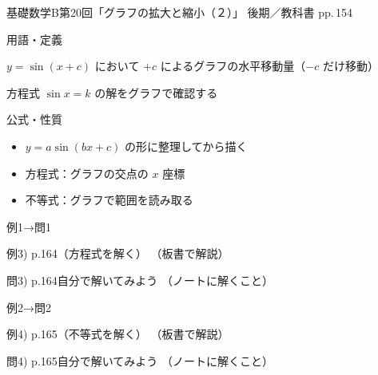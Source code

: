 \documentclass[aspectratio=43,professionalfonts,handout]{beamer}
\newcommand{\LectureNum}{20}
\newcommand{\LectureTitle}{グラフの拡大と縮小（２）}
\newcommand{\TextPages}{pp.\,154}
\newcommand{\CourseName}{基礎数学B}
\renewcommand{\TermName}{後期}
\begin{document}
\begin{frame}{\CourseName\quad 第\LectureNum 回「\LectureTitle 」}
  {\small \TermName\quad \TeacherName\quad ／\quad 教科書 \TextPages}

  \begin{block}{用語・定義}
  \begin{description}[labelwidth=5.5em]
    \item[\kw{位相：$+c$ によるグラフの水平移動}] $y = \sin(x + c)$ において $+c$ によるグラフの水平移動量（$-c$ だけ移動）
    \item[\kw{グラフから方程式・不等式の解を読み取る}] 方程式 $\sin x = k$ の解をグラフで確認する
  \end{description}
  \end{block}
\end{frame}

\begin{frame}{公式・性質}
  \begin{block}{}
  \begin{itemize}
    \item $y = a\sin(bx + c)$ の形に整理してから描く
    \item 方程式：グラフの交点の $x$ 座標
    \item 不等式：グラフで範囲を読み取る
  \end{itemize}
  \end{block}
\end{frame}

\begin{frame}{例1→問1}
  \begin{exampleblock}{例3) p.164（方程式を解く）}
    （板書で解説）
  \end{exampleblock}

  \vfill

  \begin{block}{問3) p.164\quad 自分で解いてみよう}
    （ノートに解くこと）
  \end{block}
\end{frame}

\begin{frame}{例2→問2}
  \begin{exampleblock}{例4) p.165（不等式を解く）}
    （板書で解説）
  \end{exampleblock}

  \vfill

  \begin{block}{問4) p.165\quad 自分で解いてみよう}
    （ノートに解くこと）
  \end{block}
\end{frame}
\end{document}

